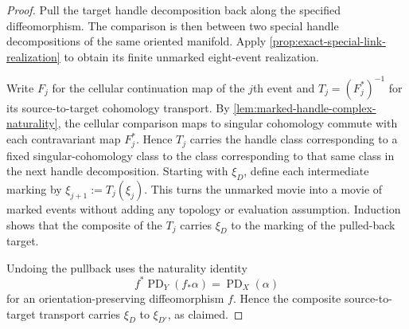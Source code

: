 \begin{proof}
Pull the target handle decomposition back along the specified
diffeomorphism.  The comparison is then between two special handle
decompositions of the same oriented manifold.  Apply
\cref{prop:exact-special-link-realization} to obtain its finite unmarked
eight-event realization.

Write $F_j$ for the cellular continuation map of the $j$th event and
$T_j=(F_j^*)^{-1}$ for its source-to-target cohomology transport.  By
\cref{lem:marked-handle-complex-naturality}, the cellular comparison maps to
singular cohomology commute with each contravariant map $F_j^*$.  Hence
$T_j$ carries the handle class corresponding to a fixed singular-cohomology
class to the class corresponding to that same class in the next handle
decomposition.  Starting with $\xi_D$, define each intermediate marking by
$\xi_{j+1}:=T_j(\xi_j)$.  This turns the unmarked movie into a movie of marked
events without adding any topology or evaluation assumption.  Induction
shows that the composite of the $T_j$ carries $\xi_D$ to the marking of the
pulled-back target.

Undoing the pullback uses the naturality
identity
\[
  f^*\operatorname{PD}_Y(f_*\alpha)=\operatorname{PD}_X(\alpha)
\]
for an orientation-preserving diffeomorphism $f$.  Hence the composite
source-to-target transport carries $\xi_D$ to $\xi_{D'}$, as claimed.
\end{proof}

